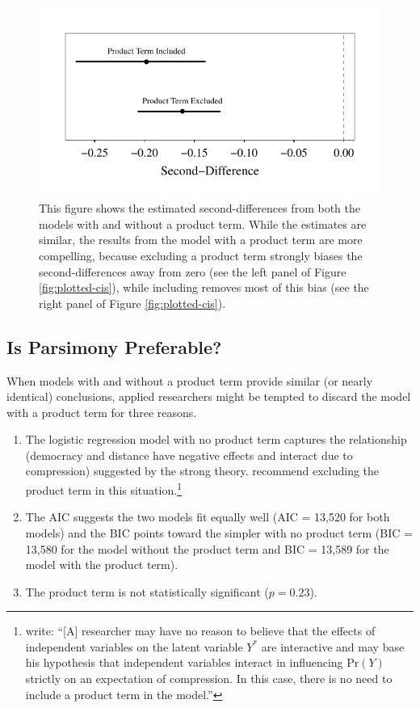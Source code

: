 \documentclass[12pt]{article}
\begin{document}
        \begin{figure}[h]
        \begin{center}
        \includegraphics[scale = .8]{fig/fig-sd-distance.pdf}
        \end{center}\caption{This figure shows the estimated second-differences from both the models with and without a product term. While the estimates are similar, the results from the model with a product term are more compelling, because excluding a product term strongly biases the second-differences away from zero (see the left panel of Figure \ref{fig:plotted-cis}), while including removes most of this bias (see the right panel of Figure \ref{fig:plotted-cis}). }\label{fig:sd-distance}
        \end{figure}

\subsection*{Is Parsimony Preferable?}

When models with and without a product term provide similar (or nearly identical) conclusions, applied researchers might be tempted to discard the model with a product term for three reasons.
\singlespace\vspace{-3mm}
\begin{enumerate}
\item The logistic regression model with no product term captures the relationship (democracy and distance have negative effects and interact due to compression) suggested by the strong theory. \cite{BerryDeMerittEsarey2010} recommend excluding the product term in this situation.\footnote{\cite{BerryDeMerittEsarey2010} write: ``[A] researcher may have no reason to believe that the effects of independent variables on the latent variable $Y^*$ are interactive and may base his hypothesis that independent variables interact in influencing $\text{Pr}(Y)$ strictly on an expectation of compression. In this case, there is no need to include a product term in the model.''}
\item The AIC suggests the two models fit equally well (AIC = 13,520 for both models) and the BIC points toward the simpler with no product term (BIC = 13,580 for the model without the product term and BIC = 13,589 for the model with the product term). 
\item The product term is not statistically significant ($p = 0.23$). 
\end{enumerate}
\doublespace
\end{document}
